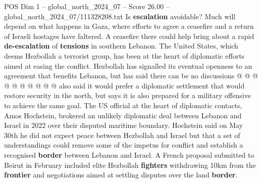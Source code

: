 \begin{textsample}{POS Dim 1 – global\_north\_2024\_07 – Score 26.00 – global\_north\_2024\_07/111328208.txt}
Is \textbf{escalation} avoidable?
Much will depend on what happens in Gaza, where efforts to agree a ceasefire and a return of Israeli hostages have faltered.
A ceasefire there could help bring about a rapid \textbf{de-escalation} of \textbf{tensions} in southern Lebanon.
The United States, which deems Hezbollah a terrorist group, has been at the heart of diplomatic efforts aimed at easing the conflict.
Hezbollah has signalled its eventual openness to an agreement that benefits Lebanon, but has said there can be no discussions @ @ @ @ @ @ @ @ @ @ also said it would prefer a diplomatic settlement that would restore security in the north, but says it is also prepared for a military offensive to achieve the same goal.
The US official at the heart of diplomatic contacts, Amos Hochstein, brokered an unlikely diplomatic deal between Lebanon and Israel in 2022 over their disputed maritime boundary.
Hochstein said on May 30th he did not expect peace between Hezbollah and Israel but that a set of understandings could remove some of the impetus for conflict and establish a recognised \textbf{border} between Lebanon and Israel.
A French proposal submitted to Beirut in February included elite Hezbollah \textbf{fighters} withdrawing 10km from the \textbf{frontier} and negotiations aimed at settling disputes over the land \textbf{border}.

\end{textsample}
